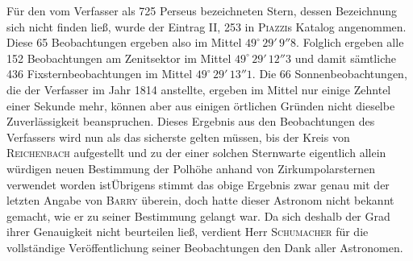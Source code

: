 \noindent{}Für den vom Verfasser als 725 Perseus bezeichneten Stern, dessen Bezeichnung sich nicht finden ließ, wurde der Eintrag II, 253 in \textsc{Piazzi}s Katalog angenommen. Diese 65 Beobachtungen ergeben also im Mittel $49^\circ\,29'\,9''8$. Folglich ergeben alle 152 Beobachtungen am Zenitsektor im Mittel $49^\circ\,29'\,12''3$ und damit sämtliche 436 Fixsternbeobachtungen im Mittel $49^\circ\,29'\,13''1$. Die 66 Sonnenbeobachtungen, die der Verfasser im Jahr 1814 anstellte, ergeben im Mittel nur einige Zehntel einer Sekunde mehr, können aber aus einigen örtlichen Gründen nicht dieselbe Zuverlässigkeit beanspruchen. Dieses Ergebnis aus den Beobachtungen des Verfassers wird nun als das sicherste gelten müssen, bis der Kreis von \textsc{Reichenbach} aufgestellt und zu der einer solchen Sternwarte eigentlich allein würdigen neuen Bestimmung der Polhöhe anhand von Zirkumpolarsternen verwendet worden ist\enspace Übrigens stimmt das obige Ergebnis zwar genau mit der letzten Angabe von \textsc{Barry} überein, doch hatte dieser Astronom nicht bekannt gemacht, wie er zu seiner Bestimmung gelangt war. Da sich deshalb der Grad ihrer Genauigkeit nicht beurteilen ließ, verdient Herr \textsc{Schumacher} für die vollständige Veröffentlichung seiner Beobachtungen den Dank aller Astronomen.
\par\clearpage\endgroup
